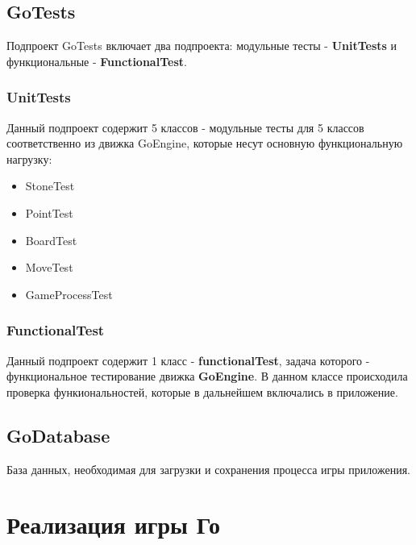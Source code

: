 \subsection*{GoTests}

Подпроект GoTests включает два подпроекта: модульные тесты - \textbf{UnitTests} и функциональные - \textbf{FunctionalTest}.\\

\subsubsection*{UnitTests}
Данный подпроект содержит 5 классов - модульные тесты для 5 классов соответственно из движка GoEngine, которые несут основную функциональную нагрузку:

\begin{itemize}
	\item StoneTest\\
	\item PointTest\\
	\item BoardTest\\
	\item MoveTest\\
	\item GameProcessTest\\
\end{itemize}

\subsubsection*{FunctionalTest}
Данный подпроект содержит 1 класс - \textbf{functionalTest}, задача которого - функциональное тестирование движка \textbf{GoEngine}. В данном классе происходила проверка функиональностей, которые в дальнейшем включались в приложение.

\subsection*{GoDatabase}

База данных, необходимая для загрузки и сохранения процесса игры приложения.\\

\section*{Реализация игры Го}

